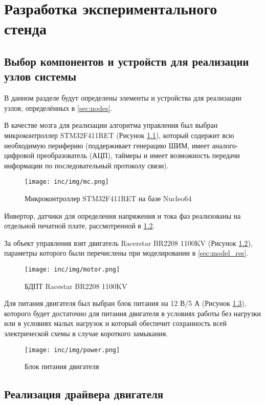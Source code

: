 \chapter{Разработка экспериментального стенда}
\label{cha:chap5}

\section{Выбор компонентов и устройств для реализации узлов системы}
\label{sec:choose}

В данном разделе будут определены элементы и устройства для реализации узлов, определённых в \ref{sec:nodes}.

В качестве мозга для реализации алгоритма управления был выбран микроконтроллер STM32F411RET (Рисунок \ref{pic:mc}), который содержит всю необходимую периферию  (поддерживает генерацию ШИМ, имеет аналого-цифровой преобразователь (АЦП), таймеры и имеет возможность передачи информации по последовательный протоколу связи).

\begin{figure}[!h]
\centering
\texttt{[image: inc/img/mc.png]}
\caption{Микроконтроллер STM32F411RET на базе Nucleo64}
\label{pic:mc}
\end{figure}

Инвертор, датчики для определения напряжения и тока фаз реализованы на отдельной печатной плате, рассмотренной в \ref{sec:driver}. 

За объект управления взят двигатель Racerstar BR2208 1100KV (Рисунок \ref{pic:motor}), параметры которого были перечислены при моделировании в \ref{sec:model_res}.

\begin{figure}[!h]
\centering
\texttt{[image: inc/img/motor.png]}
\caption{БДПТ Racestar BR2208 1100KV}
\label{pic:motor}
\end{figure}

Для питания двигателя был выбран блок питания на 12 В/5 А (Рисунок \ref{pic:power}), которого будет достаточно для питания двигателя в условиях работы без нагрузки или в условиях малых нагрузок и который обеспечит сохранность всей электрической схемы в случае короткого замыкания.

\begin{figure}[!h]
\centering
\texttt{[image: inc/img/power.png]}
\caption{Блок питания двигателя}
\label{pic:power}
\end{figure}
\clearpage
\section{Реализация драйвера двигателя}
\label{sec:driver}

